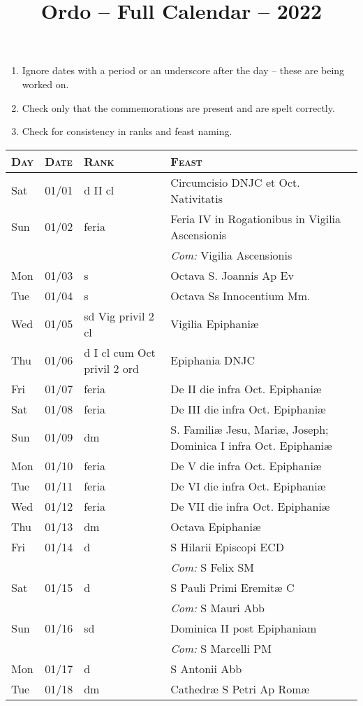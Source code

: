 \documentclass[10pt]{article}
\title{Ordo -- Full Calendar -- 2022}
\begin{document}
\begin{enumerate}
    \item Ignore dates with a period or an underscore after the day -- these are being worked on.
    \item Check only that the commemorations are present and are spelt correctly.
    \item Check for consistency in ranks and feast naming.
\end{enumerate}
\begin{longtable}{ l l l l }
\hline
\textsc{Day} & \textsc{Date} & \textsc{Rank} & \textsc{Feast} \\
\hline
\endhead
Sat & 01/01 & d II cl & Circumcisio DNJC et Oct. Nativitatis\\
Sun & 01/02 & feria & Feria IV in Rogationibus in Vigilia Ascensionis \\
 & & & \textit{Com:} Vigilia Ascensionis\\
Mon & 01/03 & s & Octava S. Joannis Ap Ev\\
Tue & 01/04 & s & Octava Ss Innocentium Mm.\\
Wed & 01/05 & sd Vig privil 2 cl & Vigilia Epiphaniæ\\
Thu & 01/06 & d I cl cum Oct privil 2 ord & Epiphania DNJC\\
Fri & 01/07 & feria & De II die infra Oct. Epiphaniæ\\
Sat & 01/08 & feria & De III die infra Oct. Epiphaniæ\\
Sun & 01/09 & dm & S. Familiæ Jesu, Mariæ, Joseph; Dominica I infra Oct. Epiphaniæ\\
Mon & 01/10 & feria & De V die infra Oct. Epiphaniæ\\
Tue & 01/11 & feria & De VI die infra Oct. Epiphaniæ\\
Wed & 01/12 & feria & De VII die infra Oct. Epiphaniæ\\
Thu & 01/13 & dm & Octava Epiphaniæ\\
Fri & 01/14 & d & S Hilarii Episcopi ECD\\
 & & & \textit{Com:} S Felix SM\\
Sat & 01/15 & d & S Pauli Primi Eremitæ C\\
 & & & \textit{Com:} S Mauri Abb\\
Sun & 01/16 & sd & Dominica II post Epiphaniam\\
 & & & \textit{Com:} S Marcelli PM\\
Mon & 01/17 & d & S Antonii Abb\\
Tue & 01/18 & dm & Cathedræ S Petri Ap Romæ\\

\end{longtable}
\end{document}
